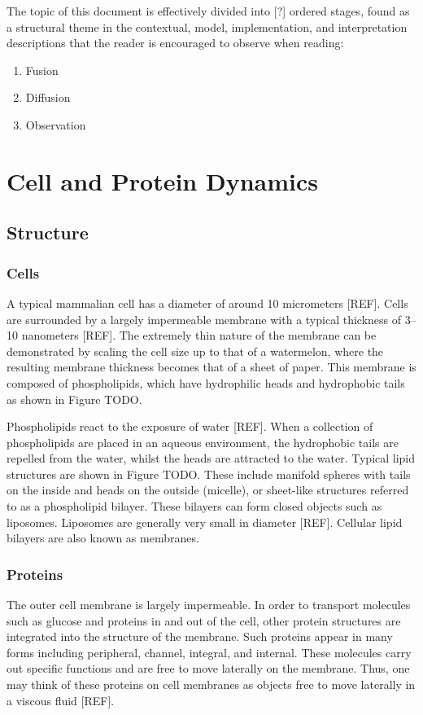 \documentclass{report}
\begin{document}
The topic of this document is effectively divided into [?] ordered stages, found as a structural theme in the contextual, model, implementation, and interpretation descriptions that the reader is encouraged to observe when reading:
\begin{enumerate}
	\item Fusion
	\item Diffusion
	\item Observation
\end{enumerate}

\part{Cell and Protein Dynamics}
\chapter{Structure}
\section{Cells}
A typical mammalian cell has a diameter of around 10 micrometers [REF]. Cells are surrounded by a largely impermeable membrane with a typical thickness of 3--10 nanometers [REF]. The extremely thin nature of the membrane can be demonstrated by scaling the cell size up to that of a watermelon, where the resulting membrane thickness becomes that of a sheet of paper. This membrane is composed of phospholipids, which have hydrophilic heads and hydrophobic tails as shown in Figure TODO.

Phospholipids react to the exposure of water [REF]. When a collection of phospholipids are placed in an aqueous environment, the hydrophobic tails are repelled from the water, whilst the heads are attracted to the water. Typical lipid structures are shown in Figure TODO. These include manifold spheres with tails on the inside and heads on the outside (micelle), or sheet-like structures referred to as a phospholipid bilayer. These bilayers can form closed objects such as liposomes. Liposomes are generally very small in diameter [REF]. Cellular lipid bilayers are also known as membranes.

\section{Proteins}
The outer cell membrane is largely impermeable. In order to transport molecules such as glucose and proteins in and out of the cell, other protein structures are integrated into the structure of the membrane. Such proteins appear in many forms including peripheral, channel, integral, and internal. These molecules carry out specific functions and are free to move laterally on the membrane. Thus, one may think of these proteins on cell membranes as objects free to move laterally in a viscous fluid [REF].
\end{document}
